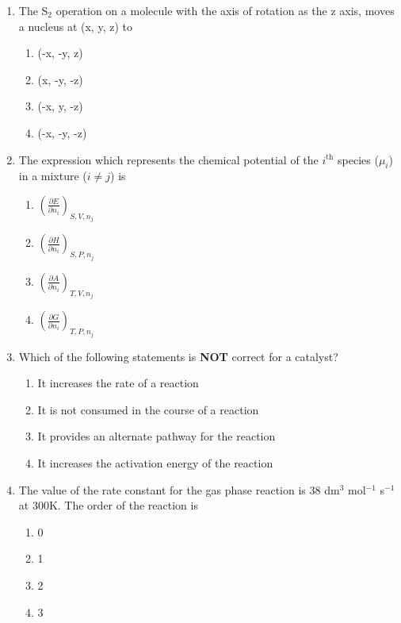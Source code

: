 \documentclass[journal,12pt,onecolumn]{IEEEtran}
\theoremstyle{remark}
\begin{document}
\begin{enumerate}
\item The S$_2$ operation on a molecule with the axis of rotation as the z axis, moves a nucleus at (x, y, z) to \hfill{}
\begin{multicols}{2}
\begin{enumerate}[leftmargin=*,labelsep=1em]
     \item   (-x, -y, z)
     \item   (x, -y, -z)
     \item   (-x, y, -z)
     \item   (-x, -y, -z)
\end{enumerate}
\end{multicols}
 

\item The expression which represents the chemical potential of the $i^{\text{th}}$ species ($\mu_i$) in a mixture ($i \ne j$) is \hfill{}
\begin{multicols}{2}
\begin{enumerate}[leftmargin=*,labelsep=1em]
     \item   $\left( \frac{\partial E}{\partial n_i} \right)_{S,V,n_j}$
     \item   $\left( \frac{\partial H}{\partial n_i} \right)_{S,P,n_j}$
     \item   $\left( \frac{\partial A}{\partial n_i} \right)_{T,V,n_j}$
     \item   $\left( \frac{\partial G}{\partial n_i} \right)_{T,P,n_j}$
\end{enumerate}
\end{multicols}
 

\item Which of the following statements is \textbf{NOT} correct for a catalyst? \hfill{}
\begin{multicols}{2}
\begin{enumerate}[leftmargin=*,labelsep=1em]
     \item   It increases the rate of a reaction
     \item   It is not consumed in the course of a reaction
     \item   It provides an alternate pathway for the reaction
     \item   It increases the activation energy of the reaction
\end{enumerate}
\end{multicols}
 

\item The value of the rate constant for the gas phase reaction  is 38 dm$^{3}$ mol$^{-1}$ s$^{-1}$ at 300K. The order of the reaction is \hfill{}
\begin{multicols}{2}
\begin{enumerate}[leftmargin=*,labelsep=1em]
     \item   0
     \item   1
     \item   2
     \item   3
\end{enumerate}
\end{multicols}


\end{enumerate}
\end{document}
